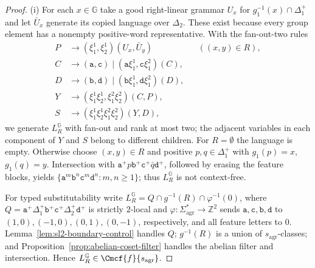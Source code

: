 \begin{proof}
(i) For each $x\in {\mathbb G}$ take a good right-linear grammar $U_x$ for
$g_1^{-1}(x)\cap\Delta_1^+$ and let $\bar U_x$ generate its copied
language over $\Delta_2$.  These exist because every group element has
a nonempty positive-word representative.  With the fan-out-two rules
\[
\begin{aligned}
 P&\to(\xi_1^1,\xi_2^1)(U_x,\bar U_y) &&((x,y)\in R),\\
 C&\to(\mathtt a,\mathtt c)
       \mid(\mathtt a\xi_1^1,\mathtt c\xi_1^2)(C),\\
 D&\to(\mathtt b,\mathtt d)
       \mid(\mathtt b\xi_1^1,\mathtt d\xi_1^2)(D),\\
 Y&\to(\xi_1^1\xi_2^1,\xi_1^2\xi_2^2)(C,P),\\
 S&\to(\xi_1^1\xi_2^1\xi_1^2\xi_2^2)(Y,D),
\end{aligned}
\]
we generate $L_R^{\mathbb G}$ with fan-out and rank at most two; the adjacent
variables in each component of $Y$ and $S$ belong to different children.
For $R=\emptyset$ the language is empty.  Otherwise choose $(x,y)\in R$
and positive $p,q\in\Delta_1^+$ with $g_1(p)=x$, $g_1(q)=y$.
Intersection with
$\mathtt a^+p\mathtt b^+\mathtt c^+\bar q\mathtt d^+$,
followed by erasing the feature blocks, yields
$\{\mathtt a^m\mathtt b^n\mathtt c^m\mathtt d^n:m,n\ge1\}$;
thus $L_R^{\mathbb G}$ is not context-free.

For typed substitutability write
$L_R^{\mathbb G}=Q\cap g^{-1}(R)\cap\varphi^{-1}(0)$, where
$Q=\mathtt a^+\Delta_1^+\mathtt b^+\mathtt c^+
\Delta_2^+\mathtt d^+$ is strictly $2$-local and
$\varphi:\Sigma_{\mathrm{agr}}^*\to\mathbb Z^2$ sends
$\mathtt a,\mathtt c,\mathtt b,\mathtt d$ to
$(1,0),(-1,0),(0,1),(0,-1)$, respectively, and all feature letters
to $0$.  Lemma~\ref{lem:sl2-boundary-control} handles $Q$;
$g^{-1}(R)$ is a union of $s_{\mathrm{agr}}$-classes; and
Proposition~\ref{prop:abelian-coset-filter} handles the abelian
filter and intersection.  Hence $L_R^{\mathbb G}\in\Cmcf{f}{s_{\mathrm{agr}}}$.


\end{proof}
